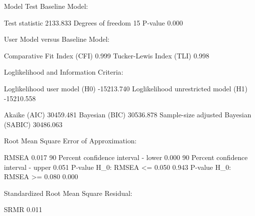 \documentclass[
]{article}
\newenvironment{Shaded}{\begin{snugshade}}{\end{snugshade}}
\newcommand{\DecValTok}[1]{\textcolor[rgb]{0.00,0.00,0.81}{#1}}
\newcommand{\FloatTok}[1]{\textcolor[rgb]{0.00,0.00,0.81}{#1}}
\newcommand{\FunctionTok}[1]{\textcolor[rgb]{0.00,0.00,0.00}{#1}}
\newcommand{\NormalTok}[1]{#1}
\newcommand{\SpecialCharTok}[1]{\textcolor[rgb]{0.00,0.00,0.00}{#1}}
\begin{document}
\begin{Shaded}
\begin{Highlighting}[]
\NormalTok{Model Test Baseline Model}\SpecialCharTok{:}

\NormalTok{  Test statistic                              }\FloatTok{2133.833}
\NormalTok{  Degrees of freedom                                }\DecValTok{15}
\NormalTok{  P}\SpecialCharTok{{-}}\NormalTok{value                                        }\FloatTok{0.000}

\NormalTok{User Model versus Baseline Model}\SpecialCharTok{:}

\NormalTok{  Comparative Fit }\FunctionTok{Index}\NormalTok{ (CFI)                    }\FloatTok{0.999}
\NormalTok{  Tucker}\SpecialCharTok{{-}}\NormalTok{Lewis }\FunctionTok{Index}\NormalTok{ (TLI)                       }\FloatTok{0.998}

\NormalTok{Loglikelihood and Information Criteria}\SpecialCharTok{:}

\NormalTok{  Loglikelihood user }\FunctionTok{model}\NormalTok{ (H0)             }\SpecialCharTok{{-}}\FloatTok{15213.740}
\NormalTok{  Loglikelihood unrestricted }\FunctionTok{model}\NormalTok{ (H1)     }\SpecialCharTok{{-}}\FloatTok{15210.558}
                                                      
  \FunctionTok{Akaike}\NormalTok{ (AIC)                               }\FloatTok{30459.481}
  \FunctionTok{Bayesian}\NormalTok{ (BIC)                             }\FloatTok{30536.878}
\NormalTok{  Sample}\SpecialCharTok{{-}}\NormalTok{size adjusted }\FunctionTok{Bayesian}\NormalTok{ (SABIC)      }\FloatTok{30486.063}

\NormalTok{Root Mean Square Error of Approximation}\SpecialCharTok{:}

\NormalTok{  RMSEA                                          }\FloatTok{0.017}
  \DecValTok{90}\NormalTok{ Percent confidence interval }\SpecialCharTok{{-}}\NormalTok{ lower         }\FloatTok{0.000}
  \DecValTok{90}\NormalTok{ Percent confidence interval }\SpecialCharTok{{-}}\NormalTok{ upper         }\FloatTok{0.051}
\NormalTok{  P}\SpecialCharTok{{-}}\NormalTok{value H\_0}\SpecialCharTok{:}\NormalTok{ RMSEA }\SpecialCharTok{\textless{}=} \FloatTok{0.050}                    \FloatTok{0.943}
\NormalTok{  P}\SpecialCharTok{{-}}\NormalTok{value H\_0}\SpecialCharTok{:}\NormalTok{ RMSEA }\SpecialCharTok{\textgreater{}=} \FloatTok{0.080}                    \FloatTok{0.000}

\NormalTok{Standardized Root Mean Square Residual}\SpecialCharTok{:}

\NormalTok{  SRMR                                           }\FloatTok{0.011}


\end{Highlighting}
\end{Shaded}
\end{document}
